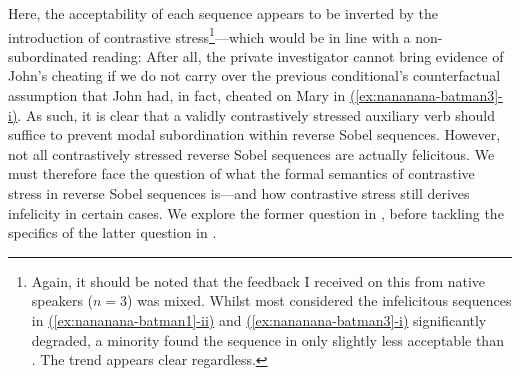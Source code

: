 Here, the acceptability of each sequence appears to be inverted by the introduction of contrastive stress\footnote{Again, it should be noted that the feedback I received on this from native speakers ($n=3$) was mixed. Whilst most considered the infelicitous sequences in \hyperref[ex:nananana-batman1]{(\ref*{ex:nananana-batman1}-ii)} and \hyperref[ex:nananana-batman3]{(\ref*{ex:nananana-batman3}-i)} significantly degraded, a minority found the sequence in  only slightly less acceptable than . The trend appears clear regardless.}---which would be in line with a non-subordinated reading: After all, the private investigator cannot bring evidence of John's cheating if we do not carry over the previous conditional's counterfactual assumption that John had, in fact, cheated on Mary in \hyperref[ex:nananana-batman3]{(\ref*{ex:nananana-batman3}-i)}. As such, it is clear that a validly contrastively stressed auxiliary verb should suffice to prevent modal subordination within reverse Sobel sequences. However, not all contrastively stressed reverse Sobel sequences are actually felicitous. We must therefore face the question of what the formal semantics of contrastive stress in reverse Sobel sequences is---and how contrastive stress still derives infelicity in certain cases. We explore the former question in , before tackling the specifics of the latter question in .

